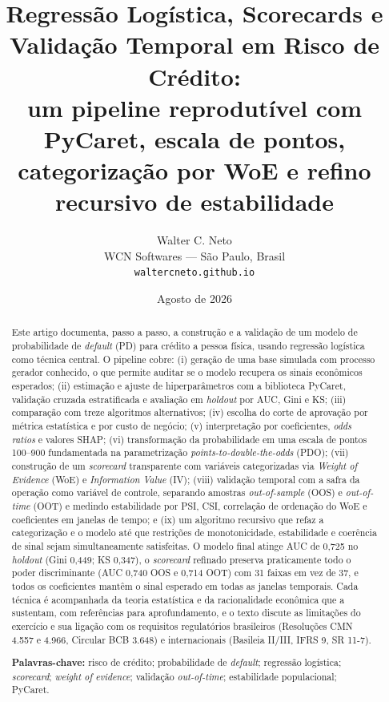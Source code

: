 \documentclass[11pt,a4paper]{article}
\title{\textbf{Regressão Logística, Scorecards e Validação Temporal em Risco de Crédito:\\ um pipeline reprodutível com PyCaret, escala de pontos, categorização por WoE e refino recursivo de estabilidade}}
\author{Walter C. Neto\\ \small WCN Softwares --- São Paulo, Brasil\\ \small \texttt{waltercneto.github.io}}
\date{Agosto de 2026}
\begin{document}
\maketitle

\begin{abstract}
\noindent Este artigo documenta, passo a passo, a construção e a validação de um modelo de probabilidade de \emph{default} (PD) para crédito a pessoa física, usando regressão logística como técnica central. O pipeline cobre: (i) geração de uma base simulada com processo gerador conhecido, o que permite auditar se o modelo recupera os sinais econômicos esperados; (ii) estimação e ajuste de hiperparâmetros com a biblioteca PyCaret, validação cruzada estratificada e avaliação em \emph{holdout} por AUC, Gini e KS; (iii) comparação com treze algoritmos alternativos; (iv) escolha do corte de aprovação por métrica estatística e por custo de negócio; (v) interpretação por coeficientes, \emph{odds ratios} e valores SHAP; (vi) transformação da probabilidade em uma escala de pontos 100--900 fundamentada na parametrização \emph{points-to-double-the-odds} (PDO); (vii) construção de um \emph{scorecard} transparente com variáveis categorizadas via \emph{Weight of Evidence} (WoE) e \emph{Information Value} (IV); (viii) validação temporal com a safra da operação como variável de controle, separando amostras \emph{out-of-sample} (OOS) e \emph{out-of-time} (OOT) e medindo estabilidade por PSI, CSI, correlação de ordenação do WoE e coeficientes em janelas de tempo; e (ix) um algoritmo recursivo que refaz a categorização e o modelo até que restrições de monotonicidade, estabilidade e coerência de sinal sejam simultaneamente satisfeitas. O modelo final atinge AUC de 0{,}725 no \emph{holdout} (Gini 0{,}449; KS 0{,}347), o \emph{scorecard} refinado preserva praticamente todo o poder discriminante (AUC 0{,}740 OOS e 0{,}714 OOT) com 31 faixas em vez de 37, e todos os coeficientes mantêm o sinal esperado em todas as janelas temporais. Cada técnica é acompanhada da teoria estatística e da racionalidade econômica que a sustentam, com referências para aprofundamento, e o texto discute as limitações do exercício e sua ligação com os requisitos regulatórios brasileiros (Resoluções CMN 4.557 e 4.966, Circular BCB 3.648) e internacionais (Basileia II/III, IFRS 9, SR 11-7).

\medskip
\noindent\textbf{Palavras-chave:} risco de crédito; probabilidade de \emph{default}; regressão logística; \emph{scorecard}; \emph{weight of evidence}; validação \emph{out-of-time}; estabilidade populacional; PyCaret.
\end{abstract}
\end{document}
